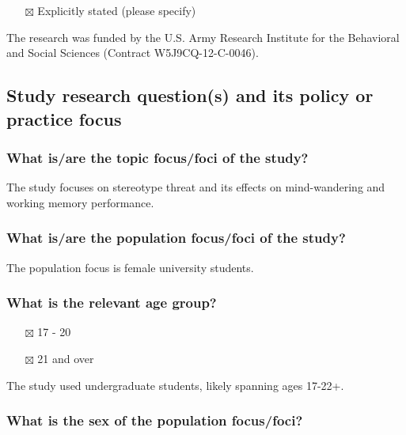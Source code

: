 \documentclass[
  doc, a4paper]{apa7}
\providecommand{\tightlist}{%
  \setlength{\itemsep}{0pt}\setlength{\parskip}{0pt}}
\begin{document}
\begin{itemize}
\tightlist
\item[$\boxtimes$]
  Explicitly stated (please specify)
\end{itemize}

The research was funded by the U.S. Army Research Institute for the Behavioral and Social Sciences (Contract W5J9CQ-12-C-0046).

\subsection{Study research question(s) and its policy or practice focus}\label{study-research-questions-and-its-policy-or-practice-focus}

\subsubsection{What is/are the topic focus/foci of the study?}\label{what-isare-the-topic-focusfoci-of-the-study}

The study focuses on stereotype threat and its effects on mind-wandering and working memory performance.

\subsubsection{What is/are the population focus/foci of the study?}\label{what-isare-the-population-focusfoci-of-the-study}

The population focus is female university students.

\subsubsection{What is the relevant age group?}\label{what-is-the-relevant-age-group}

\begin{itemize}
\tightlist
\item[$\boxtimes$]
  17 - 20\\
\item[$\boxtimes$]
  21 and over
\end{itemize}

The study used undergraduate students, likely spanning ages 17-22+.

\subsubsection{What is the sex of the population focus/foci?}\label{what-is-the-sex-of-the-population-focusfoci}
\end{document}
